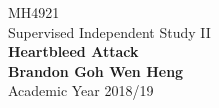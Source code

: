 \documentclass[a4paper,12pt]{article}
\begin{document}
	\begin{titlepage}
		\begin{center}
			\vspace*{9em}
			\Huge 
			MH4921\\ Supervised Independent Study II\\
			\vspace*{4em}
			\LARGE
			\textbf{Heartbleed Attack}\\		
			\vspace{4em}
			\textbf{Brandon Goh Wen Heng}\\
			\vspace*{4em}
			Academic Year 2018/19
			\vfill
		\end{center}
	\end{titlepage}
	
	\tableofcontents
	\newpage
\end{document}
